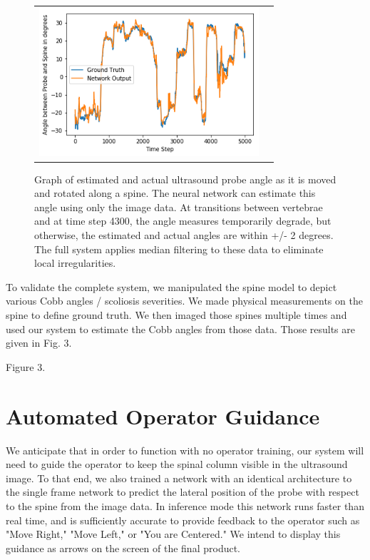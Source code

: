 \documentclass{article}
\begin{document}
\begin{figure}
\centering
\begin{tabular}{cc}
\centering
\includegraphics[height=5.5cm,keepaspectratio]{NetworkOutput}
\end{tabular}
\caption{Graph of estimated and actual ultrasound probe angle as it is moved and rotated along a spine.  The neural network can estimate this angle using only the image data.  At transitions between vertebrae and at time step 4300, the angle measures temporarily degrade, but otherwise, the estimated and actual angles are within +/- 2 degrees.  The full system applies median filtering to these data to eliminate local irregularities.
}
\end{figure}
 

To validate the complete system, we manipulated the spine model to depict various Cobb angles / scoliosis severities.   We made physical measurements on the spine to define ground truth.  We then imaged those spines multiple times and used our system to estimate the Cobb angles from those data.  Those results are given in Fig. 3.


Figure 3. 

\section{Automated Operator Guidance}
We anticipate that in order to function with no operator training, our system will need to guide the operator to keep the spinal column visible in the ultrasound image. To that end, we also trained a network with an identical architecture to the single frame network to predict the lateral position of the probe with respect to the spine from the image data. In inference mode this network runs faster than real time, and is sufficiently accurate to provide feedback to the operator such as "Move Right," "Move Left," or "You are Centered." We intend to display this guidance as arrows on the screen of the final product.
\end{document}
